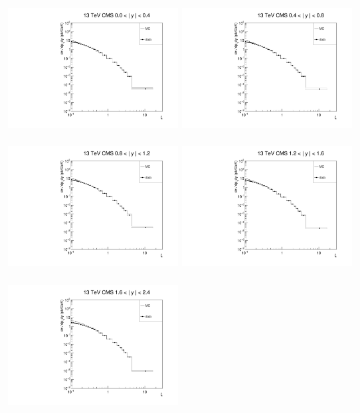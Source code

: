 \documentclass{article}
\begin{document}
\clearpage

\begin{figure}[h!]
\centering
\includegraphics[width = 0.4\textwidth]{xi_13_C_y1.pdf}
\includegraphics[width = 0.4\textwidth]{xi_13_C_y2.pdf}

\includegraphics[width = 0.4\textwidth]{xi_13_C_y3.pdf}
\includegraphics[width = 0.4\textwidth]{xi_13_C_y4.pdf}

\includegraphics[width = 0.4\textwidth]{xi_13_C_y5.pdf}
\end{figure}
\end{document}
